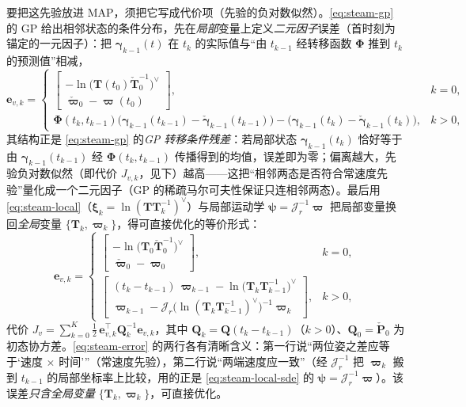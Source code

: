 要把这先验放进 MAP，须把它写成代价项（先验的负对数似然）。\cref{eq:steam-gp} 的 GP 给出相邻状态的条件分布，先在\emph{局部}变量上定义\emph{二元因子}误差（首时刻为锚定的一元因子）：把 $\boldsymbol{\gamma}_{k-1}(t)$ 在 $t_k$ 的实际值与“由 $t_{k-1}$ 经转移函数 $\boldsymbol{\Phi}$ 推到 $t_k$ 的预测值”相减，
\begin{equation}
  \mathbf{e}_{v,k}=
  \begin{cases}
    \begin{bmatrix}-\ln\!\big(\mathbf{T}(t_0)\check{\mathbf{T}}_0^{-1}\big)^\vee\\[2pt]\check{\boldsymbol{\varpi}}_0-\boldsymbol{\varpi}(t_0)\end{bmatrix}, & k=0,\\[12pt]
    \boldsymbol{\Phi}(t_k,t_{k-1})\big(\boldsymbol{\gamma}_{k-1}(t_{k-1})-\check{\boldsymbol{\gamma}}_{k-1}(t_{k-1})\big)-\big(\boldsymbol{\gamma}_{k-1}(t_k)-\check{\boldsymbol{\gamma}}_{k-1}(t_k)\big), & k>0,
  \end{cases}
  \label{eq:steam-error-local}
\end{equation}
其结构正是 \cref{eq:steam-gp} 的\emph{GP 转移条件残差}：若局部状态 $\boldsymbol{\gamma}_{k-1}(t_k)$ 恰好等于由 $\boldsymbol{\gamma}_{k-1}(t_{k-1})$ 经 $\boldsymbol{\Phi}(t_k,t_{k-1})$ 传播得到的均值，误差即为零；偏离越大，先验负对数似然（即代价 $J_{v,k}$，见下）越高——这把“相邻两态是否符合常速度先验”量化成一个二元因子（GP 的稀疏马尔可夫性保证只连相邻两态）。最后用 \cref{eq:steam-local}（$\boldsymbol{\xi}_k=\ln(\mathbf{T}\mathbf{T}_k^{-1})^\vee$）与局部运动学 $\boldsymbol{\psi}=\boldsymbol{\mathcal{J}}_r^{-1}\boldsymbol{\varpi}$ 把局部变量换回\emph{全局}变量 $\{\mathbf{T}_k,\boldsymbol{\varpi}_k\}$，得可直接优化的等价形式：
\begin{equation}
  \mathbf{e}_{v,k}=
  \begin{cases}
    \begin{bmatrix}-\ln\!\big(\mathbf{T}_0\check{\mathbf{T}}_0^{-1}\big)^\vee\\[2pt]\check{\boldsymbol{\varpi}}_0-\boldsymbol{\varpi}_0\end{bmatrix}, & k=0,\\[14pt]
    \begin{bmatrix}(t_k-t_{k-1})\,\boldsymbol{\varpi}_{k-1}-\ln\!\big(\mathbf{T}_k\mathbf{T}_{k-1}^{-1}\big)^\vee\\[4pt]
    \boldsymbol{\varpi}_{k-1}-\boldsymbol{\mathcal{J}}_r\!\big(\ln(\mathbf{T}_k\mathbf{T}_{k-1}^{-1})^\vee\big)^{-1}\boldsymbol{\varpi}_k\end{bmatrix}, & k>0,
  \end{cases}
  \label{eq:steam-error}
\end{equation}
代价 $J_v=\sum_{k=0}^{K}\tfrac12\,\mathbf{e}_{v,k}^\top\mathbf{Q}_k^{-1}\mathbf{e}_{v,k}$，其中 $\mathbf{Q}_k=\mathbf{Q}(t_k-t_{k-1})$（$k>0$）、$\mathbf{Q}_0=\check{\mathbf{P}}_0$ 为初态协方差。\cref{eq:steam-error} 的两行各有清晰含义：第一行说“两位姿之差应等于‘速度 $\times$ 时间’”（常速度先验），第二行说“两端速度应一致”（经 $\boldsymbol{\mathcal{J}}_r^{-1}$ 把 $\boldsymbol{\varpi}_k$ 搬到 $t_{k-1}$ 的局部坐标率上比较，用的正是 \cref{eq:steam-local-sde} 的 $\boldsymbol{\psi}=\boldsymbol{\mathcal{J}}_r^{-1}\boldsymbol{\varpi}$）。该误差\emph{只含全局变量} $\{\mathbf{T}_k,\boldsymbol{\varpi}_k\}$，可直接优化。

